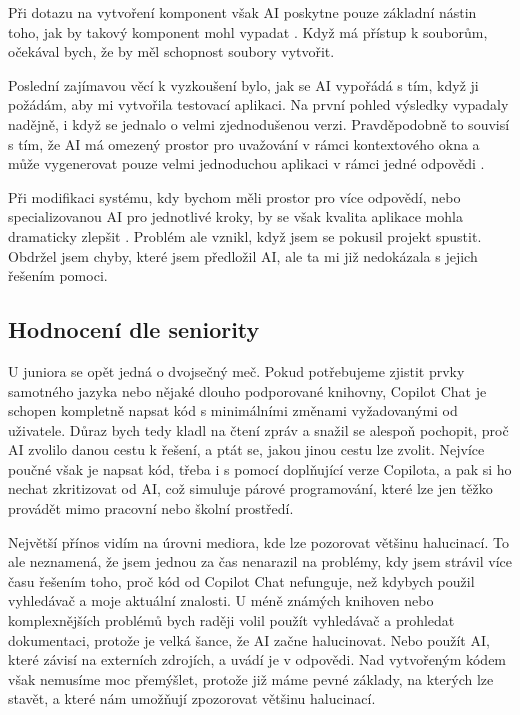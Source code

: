 \documentclass[FM,DP]{tulthesis}
\begin{document}
		Při dotazu na vytvoření komponent však AI poskytne pouze základní nástin toho, jak by takový komponent mohl vypadat \cite{rag_chart}. Když má přístup k souborům, očekával bych, že by měl schopnost soubory vytvořit.
		
		Poslední zajímavou věcí k vyzkoušení bylo, jak se AI vypořádá s tím, když ji požádám, aby mi vytvořila testovací aplikaci. Na první pohled výsledky vypadaly nadějně, i když se jednalo o velmi zjednodušenou verzi. Pravděpodobně to souvisí s tím, že AI má omezený prostor pro uvažování v rámci kontextového okna a může vygenerovat pouze velmi jednoduchou aplikaci v rámci jedné odpovědi \cite{compressing}. 
		
		Při modifikaci systému, kdy bychom měli prostor pro více odpovědí, nebo specializovanou AI pro jednotlivé kroky, by se však kvalita aplikace mohla dramaticky zlepšit \cite{autogen_saas}. Problém ale vznikl, když jsem se pokusil projekt spustit. Obdržel jsem chyby, které jsem předložil AI, ale ta mi již nedokázala s jejich řešením pomoci.
		
		\subsection{Hodnocení dle seniority}
		U juniora se opět jedná o dvojsečný meč. Pokud potřebujeme zjistit prvky samotného jazyka nebo nějaké dlouho podporované knihovny, Copilot Chat je schopen kompletně napsat kód s minimálními změnami vyžadovanými od uživatele. Důraz bych tedy kladl na čtení zpráv a snažil se alespoň pochopit, proč AI zvolilo danou cestu k řešení, a ptát se, jakou jinou cestu lze zvolit. Nejvíce poučné však je napsat kód, třeba i s pomocí doplňující verze Copilota, a pak si ho nechat zkritizovat od AI, což simuluje párové programování, které lze jen těžko provádět mimo pracovní nebo školní prostředí.
		
		Největší přínos vidím na úrovni mediora, kde lze pozorovat většinu halucinací. To ale neznamená, že jsem jednou za čas nenarazil na problémy, kdy jsem strávil více času řešením toho, proč kód od Copilot Chat nefunguje, než kdybych použil vyhledávač a moje aktuální znalosti. U méně známých knihoven nebo komplexnějších problémů bych raději volil použít vyhledávač a prohledat dokumentaci, protože je velká šance, že AI začne halucinovat. Nebo použít AI, které závisí na externích zdrojích, a uvádí je v odpovědi. Nad vytvořeným kódem však nemusíme moc přemýšlet, protože již máme pevné základy, na kterých lze stavět, a které nám umožňují zpozorovat většinu halucinací.
		
\end{document}
